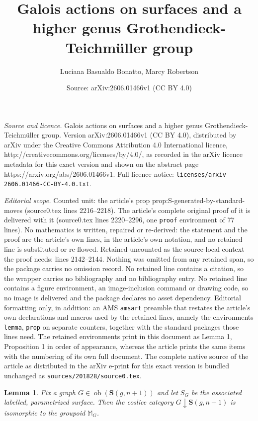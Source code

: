 \documentclass[10pt,a4paper]{amsart}
\title{Galois actions on surfaces and a higher genus Grothendieck-Teichm\"{u}ller group}
\author{Luciana Basualdo Bonatto, Marcy Robertson}
\date{Source: arXiv:2606.01466v1 (CC BY 4.0)}
\newtheorem{lemma}{Lemma}
\newcommand{\bS}{\mathbf{S}}
\newcommand{\ob}{\operatorname{ob}}
\begin{document}
\maketitle

\noindent\emph{Source and licence.} Galois actions on surfaces and a higher genus Grothendieck-Teichm\"{u}ller group. Version arXiv:2606.01466v1 (CC BY 4.0), distributed by arXiv under the Creative Commons Attribution 4.0 International licence, http://creativecommons.org/licenses/by/4.0/, as recorded in the arXiv licence metadata for this exact version and shown on the abstract page https://arxiv.org/abs/2606.01466v1. Full licence notice: \texttt{licenses/arxiv-2606.01466-CC-BY-4.0.txt}.\par\smallskip

\noindent\textit{Editorial scope.} Counted unit: the article's prop prop:S-generated-by-standard-moves (source0.tex lines 2216--2218). The article's complete original proof of it is delivered with it (source0.tex lines 2220--2296, one \texttt{proof} environment of 77 lines). No mathematics is written, repaired or re-derived: the statement and the proof are the article's own lines, in the article's own notation, and no retained line is substituted or re-flowed.  Retained uncounted as the source-local context the proof needs: lines 2142--2144.  Nothing was omitted from any retained span, so the package carries no omission record.  No retained line contains a citation, so the wrapper carries no bibliography and no bibliography entry.  No retained line contains a figure environment, an image-inclusion command or drawing code, so no image is delivered and the package declares no asset dependency.  Editorial formatting only, in addition: an AMS \texttt{amsart} preamble that restates the article's own declarations and macros used by the retained lines, namely the environments \texttt{lemma}, \texttt{prop} on separate counters, together with the standard packages those lines need.  The retained environments print in this document as Lemma 1, Proposition 1 in order of appearance, whereas the article prints the same items with the numbering of its own full document.  The complete native source of the article as distributed in the arXiv e-print for this exact version is bundled unchanged as \texttt{sources/201828/source0.tex}.
\begin{lemma}\label{lemma: the complexes of morphisms and markings}
Fix a graph $G\in \ob(\bS(g,n+1))$ and let $S_G$ be the associated labelled, parametrized surface. Then the coslice category $G\downarrow \bS(g,n+1)$ is isomorphic to the groupoid $\mathbb{M}_G$.
\end{lemma}
\end{document}
